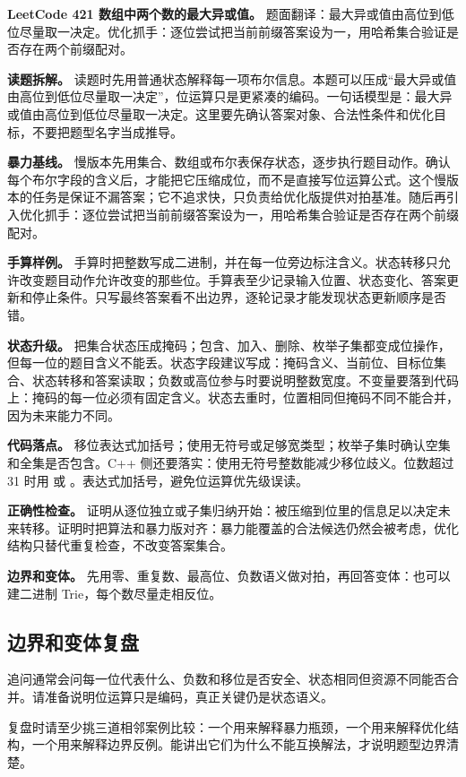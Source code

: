 \noindent\textbf{LeetCode 421 数组中两个数的最大异或值。} 题面翻译：最大异或值由高位到低位尽量取一决定。优化抓手：逐位尝试把当前前缀答案设为一，用哈希集合验证是否存在两个前缀配对。

\textbf{读题拆解。} 读题时先用普通状态解释每一项布尔信息。本题可以压成“最大异或值由高位到低位尽量取一决定”，位运算只是更紧凑的编码。一句话模型是：最大异或值由高位到低位尽量取一决定。这里要先确认答案对象、合法性条件和优化目标，不要把题型名字当成推导。

\textbf{暴力基线。} 慢版本先用集合、数组或布尔表保存状态，逐步执行题目动作。确认每个布尔字段的含义后，才能把它压缩成位，而不是直接写位运算公式。这个慢版本的任务是保证不漏答案；它不追求快，只负责给优化版提供对拍基准。随后再引入优化抓手：逐位尝试把当前前缀答案设为一，用哈希集合验证是否存在两个前缀配对。

\textbf{手算样例。} 手算时把整数写成二进制，并在每一位旁边标注含义。状态转移只允许改变题目动作允许改变的那些位。手算表至少记录输入位置、状态变化、答案更新和停止条件。只写最终答案看不出边界，逐轮记录才能发现状态更新顺序是否错。

\textbf{状态升级。} 把集合状态压成掩码；包含、加入、删除、枚举子集都变成位操作，但每一位的题目含义不能丢。状态字段建议写成：掩码含义、当前位、目标位集合、状态转移和答案读取；负数或高位参与时要说明整数宽度。不变量要落到代码上：掩码的每一位必须有固定含义。状态去重时，位置相同但掩码不同不能合并，因为未来能力不同。

\textbf{代码落点。} 移位表达式加括号；使用无符号或足够宽类型；枚举子集时确认空集和全集是否包含。C++ 侧还要落实：使用无符号整数能减少移位歧义。位数超过 31 时用  或 。表达式加括号，避免位运算优先级误读。

\textbf{正确性检查。} 证明从逐位独立或子集归纳开始：被压缩到位里的信息足以决定未来转移。证明时把算法和暴力版对齐：暴力能覆盖的合法候选仍然会被考虑，优化结构只替代重复检查，不改变答案集合。

\textbf{边界和变体。} 先用零、重复数、最高位、负数语义做对拍，再回答变体：也可以建二进制 Trie，每个数尽量走相反位。

\subsection{边界和变体复盘}

追问通常会问每一位代表什么、负数和移位是否安全、状态相同但资源不同能否合并。请准备说明位运算只是编码，真正关键仍是状态语义。

复盘时请至少挑三道相邻案例比较：一个用来解释暴力瓶颈，一个用来解释优化结构，一个用来解释边界反例。能讲出它们为什么不能互换解法，才说明题型边界清楚。

